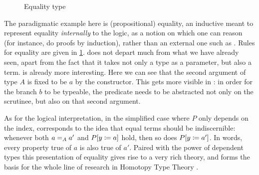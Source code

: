 \begin{figure}
  \caption{Equality type}
  \label{fig:eq-type}
\end{figure}

The paradigmatic example here is (propositional) equality, an
inductive meant to represent equality \emph{internally} to the logic, \ie as a notion on
which one can reason (for instance, do proofs by induction), rather than an external one
such as .
Rules for equality are given in \cref{fig:eq-type}.  does not depart
much from what we have already seen,
apart from the fact that it takes not only a type as a parameter, but
also a term.  is already more interesting. Here we can see that
the second argument of type $A$ is fixed to be $a$ by the constructor. This gets
more visible in : in order for the branch $b$
to be typeable, the predicate needs to be abstracted not only on the scrutinee,
but also on that second argument.

As for the logical interpretation, in the simplified case where $P$ only depends on the index,
 corresponds to the idea that equal terms should be indiscernible:
whenever both $\eqty[A]{a}{a'}$ and $P[y \coloneqq a]$ hold, then so does $P[y \coloneqq a']$.
In words, every property true of $a$ is also true of $a'$. Paired with the power of
dependent types this presentation of equality gives rise to a very rich theory, and
forms the basis for the whole line of research in Homotopy Type Theory .

